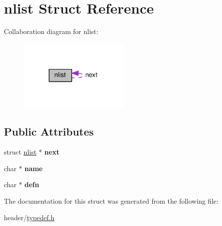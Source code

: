 \hypertarget{structnlist}{}\section{nlist Struct Reference}
\label{structnlist}


Collaboration diagram for nlist\+:\nopagebreak
\begin{figure}[H]
\begin{center}
\leavevmode
\includegraphics[width=155pt]{structnlist__coll__graph}
\end{center}
\end{figure}
\subsection*{Public Attributes}
\begin{DoxyCompactItemize}
\item 
struct \hyperlink{structnlist}{nlist} $\ast$ {\bfseries next}\hypertarget{structnlist_a6e5fbb2f12a2799e60611dbda92c6f38}{}\label{structnlist_a6e5fbb2f12a2799e60611dbda92c6f38}

\item 
char $\ast$ {\bfseries name}\hypertarget{structnlist_adae5489b500836e59f19fad605a63b07}{}\label{structnlist_adae5489b500836e59f19fad605a63b07}

\item 
char $\ast$ {\bfseries defn}\hypertarget{structnlist_a1405526a048e968f43d1b8495d5143ca}{}\label{structnlist_a1405526a048e968f43d1b8495d5143ca}

\end{DoxyCompactItemize}


The documentation for this struct was generated from the following file\+:\begin{DoxyCompactItemize}
\item 
header/\hyperlink{typedef_8h}{typedef.\+h}\end{DoxyCompactItemize}
